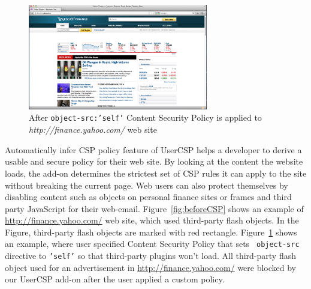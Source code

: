 \begin{figure}[!ht]
\begin{center}
\includegraphics[width=0.7\textwidth]{after-csp23}
\end{center}
\caption{After {\tt object-src:'self'} Content Security Policy is
  applied to {\it http://finance.yahoo.com/} web site}
\label{fig:afterCSP}
\end{figure}

Automatically infer CSP policy feature of UserCSP helps a developer to
derive a usable and secure policy for their web site. By looking at
the content the website loads, the add-on determines the strictest set
of CSP rules it can apply to the site without breaking the current
page. Web users can also protect themselves by disabling content such
as objects on personal finance sites or frames and third party
JavaScript for their web-email.  Figure~\ref{fig:beforeCSP} shows an
example of \url{http://finance.yahoo.com/} web site, which used
third-party flash objects. In the Figure, third-party flash objects
are marked with red rectangle. Figure~\ref{fig:afterCSP} shows an
example, where user specified Content Security Policy that sets {\tt
  object-src} directive to {\tt 'self'} so that third-party plugins
won't load.  All third-party flash object used for an advertisement in
\url{http://finance.yahoo.com/} were blocked by our UserCSP add-on
after the user applied a custom policy.

